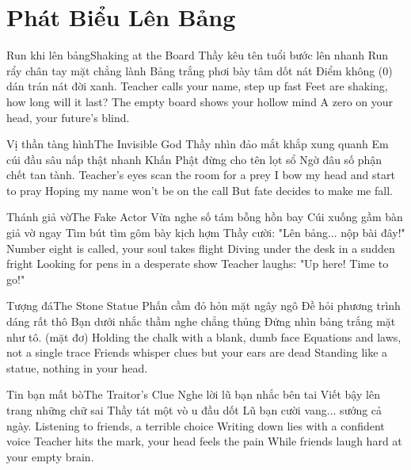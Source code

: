\chapter{Phát Biểu Lên Bảng}

\begin{tutuyetbox}{Run khi lên bảng}{Shaking at the Board}
Thầy kêu tên tuổi bước lên nhanh
Run rẩy chân tay mặt chẳng lành
Bảng trắng phơi bày tâm dốt nát
Điểm không (0) dán trán nát đời xanh.
\tcblower
Teacher calls your name, step up fast 
Feet are shaking, how long will it last? 
The empty board shows your hollow mind 
A zero on your head, your future's blind.
\end{tutuyetbox}

\begin{tutuyetbox}{Vị thần tàng hình}{The Invisible God}
Thầy nhìn đảo mắt khắp xung quanh
Em cúi đầu sâu nấp thật nhanh
Khấn Phật đừng cho tên lọt sổ
Ngờ đâu số phận chết tan tành.
\tcblower
Teacher's eyes scan the room for a prey
I bow my head and start to pray
Hoping my name won't be on the call
But fate decides to make me fall.
\end{tutuyetbox}

\begin{tutuyetbox}{Thánh giả vờ}{The Fake Actor}
Vừa nghe số tám bỗng hồn bay
Cúi xuống gầm bàn giả vờ ngay
Tìm bút tìm gôm bày kịch hợm
Thầy cười: "Lên bảng... nộp bài đây!"
\tcblower
Number eight is called, your soul takes flight
Diving under the desk in a sudden fright
Looking for pens in a desperate show
Teacher laughs: "Up here! Time to go!"
\end{tutuyetbox}

\begin{tutuyetbox}{Tượng đá}{The Stone Statue}
Phấn cầm đỏ hỏn mặt ngây ngô
Đề hỏi phương trình dáng rất thô
Bạn dưới nhắc thầm nghe chẳng thủng
Đứng nhìn bảng trắng mặt như tô. (mặt đơ)
\tcblower
Holding the chalk with a blank, dumb face
Equations and laws, not a single trace
Friends whisper clues but your ears are dead
Standing like a statue, nothing in your head.
\end{tutuyetbox}

\begin{tutuyetbox}{Tin bạn mất bò}{The Traitor's Clue}
Nghe lời lũ bạn nhắc bên tai
Viết bậy lên trang những chữ sai
Thầy tát một vò u đầu dốt
Lũ bạn cười vang... sướng cả ngày.
\tcblower
Listening to friends, a terrible choice
Writing down lies with a confident voice
Teacher hits the mark, your head feels the pain
While friends laugh hard at your empty brain.
\end{tutuyetbox}

